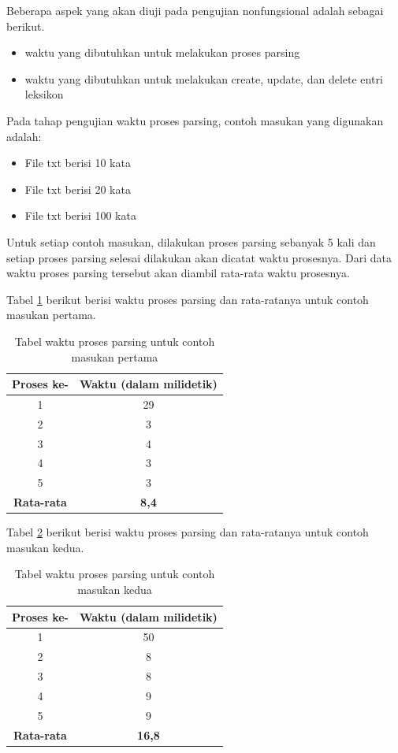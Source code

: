 Beberapa aspek yang akan diuji pada pengujian nonfungsional adalah sebagai berikut.

\begin{itemize}
	\item waktu yang dibutuhkan untuk melakukan proses parsing
	\item waktu yang dibutuhkan untuk melakukan create, update, dan delete entri leksikon
\end{itemize}

Pada tahap pengujian waktu proses parsing, contoh masukan yang digunakan adalah:

\begin{itemize}
	\item File txt berisi 10 kata
	\item File txt berisi 20 kata
	\item File txt berisi 100 kata
\end{itemize}

Untuk setiap contoh masukan, dilakukan proses parsing sebanyak 5 kali dan setiap proses parsing selesai dilakukan akan dicatat waktu prosesnya. Dari data waktu proses parsing tersebut akan diambil rata-rata waktu prosesnya.

Tabel \ref{tabel-waktu-parsing-pertama} berikut berisi waktu proses parsing dan rata-ratanya untuk contoh masukan pertama.

\begin{table}[H]
\centering
\begin{tabular}{|c|c|}
\hline
\textbf{Proses ke-} & \textbf{Waktu} (dalam milidetik) \\
\hline
1&29\\
2&3\\
3&4\\
4&3\\
5&3\\
\hline
\textbf{Rata-rata} & \textbf{8,4}\\
\hline
\end{tabular}
\caption{Tabel waktu proses parsing untuk contoh masukan pertama} 
\label{tabel-waktu-parsing-pertama}
\end{table}

Tabel \ref{tabel-waktu-parsing-kedua} berikut berisi waktu proses parsing dan rata-ratanya untuk contoh masukan kedua.

\begin{table}[H]
\centering
\begin{tabular}{|c|c|}
\hline
\textbf{Proses ke-} & \textbf{Waktu} (dalam milidetik) \\
\hline
1&50\\
2&8\\
3&8\\
4&9\\
5&9\\
\hline
\textbf{Rata-rata} & \textbf{16,8}\\
\hline
\end{tabular}
\caption{Tabel waktu proses parsing untuk contoh masukan kedua} 
\label{tabel-waktu-parsing-kedua}
\end{table}

